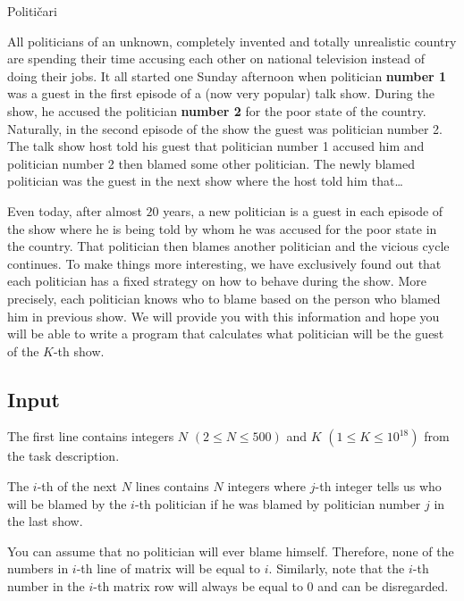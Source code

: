 \begin{statement}[
problempoints=70,
timelimit=1 second,
memorylimit=512 MiB,
]{Političari}

All politicians of an unknown, completely invented and totally unrealistic
country are spending their time accusing each other on national television
instead of doing their jobs. It all started one Sunday afternoon when
politician \textbf{number 1} was a guest in the first episode of a (now very
popular) talk show. During the show, he accused the politician \textbf{number
2} for the poor state of the country. Naturally, in the second episode of the
show the guest was politician number 2. The talk show host told his guest that
politician number 1 accused him and politician number 2 then blamed some other
politician. The newly blamed politician was the guest in the next show where the
host told him that\dots

Even today, after almost $20$ years, a new politician is a guest in each episode of the show where
he is being told by whom he was accused for the poor state in the country. That politician
then blames another politician and the vicious cycle continues. To make things
more interesting, we have exclusively found out that each politician has a fixed
strategy on how to behave during the show. More precisely, each politician knows
who to blame based on the person who blamed him in previous show. We will provide
you with this information and hope you will be able to write a program that
calculates what politician will be the guest of the $K$-th show.

\subsection*{Input}
The first line contains integers $N$ $(2 \le N \le 500)$ and $K$
$(1 \le K \le 10^{18})$ from the task description.

The $i$-th of the next $N$ lines contains $N$ integers where $j$-th
integer tells us who will be blamed by the $i$-th politician if he was
blamed by politician number $j$ in the last show.

You can assume that no politician will ever blame himself. Therefore,
none of the numbers in $i$-th line of matrix will be equal to $i$. Similarly, note
that the $i$-th number in the $i$-th matrix row will always be equal to $0$ and
can be disregarded.


\end{statement}
